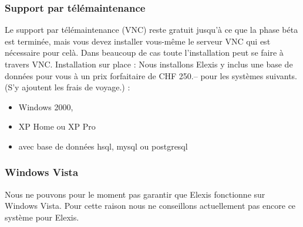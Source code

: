 \subsubsection{Support par télémaintenance}

Le support par télémaintenance (VNC) reste gratuit jusqu'à ce que la phase béta est terminée, mais vous devez installer vous-même le serveur VNC qui est nécessaire pour celà. Dans beaucoup de cas toute l'installation peut se faire à travers VNC.
Installation sur place :
Nous installons Elexis y inclus une base de données pour vous à un prix forfaitaire de CHF 250.-- pour les systèmes suivants. (S'y ajoutent les frais de voyage.) :
\begin{itemize}
 \item Windows 2000,
\item XP Home ou XP Pro
\item avec base de données hsql, mysql ou postgresql
\end{itemize}

\subsubsection{Windows Vista}
Nous ne pouvons pour le moment pas garantir que Elexis fonctionne sur Windows Vista. Pour cette raison nous ne conseillons actuellement pas encore ce système pour Elexis.

